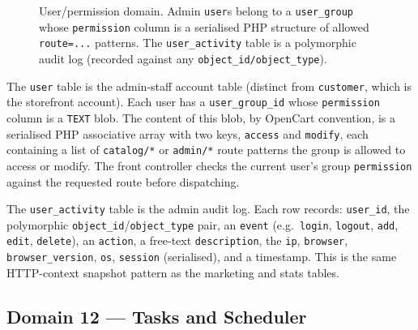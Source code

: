 \documentclass[11pt,a4paper]{article}
\begin{document}
\begin{figure}[htbp]
\centering
{}
\caption{User/permission domain. Admin \texttt{user}s belong to
a \texttt{user\_group} whose \texttt{permission} column is a
serialised PHP structure of allowed \texttt{route=...} patterns.
The \texttt{user\_activity} table is a polymorphic audit log
(recorded against any \texttt{object\_id/object\_type}).}
\label{fig:users}
\end{figure}

The \texttt{user} table is the admin-staff account table
(distinct from \texttt{customer}, which is the storefront
account). Each user has a \texttt{user\_group\_id} whose
\texttt{permission} column is a \texttt{TEXT} blob. The
content of this blob, by OpenCart convention, is a
serialised PHP associative array with two keys,
\texttt{access} and \texttt{modify}, each containing a list
of \texttt{catalog/*} or \texttt{admin/*} route patterns the
group is allowed to access or modify. The front controller
checks the current user's group \texttt{permission} against
the requested route before dispatching.

The \texttt{user\_activity} table is the admin audit log.
Each row records: \texttt{user\_id}, the polymorphic
\texttt{object\_id}/\texttt{object\_type} pair, an
\texttt{event} (e.g.\ \texttt{login}, \texttt{logout},
\texttt{add}, \texttt{edit}, \texttt{delete}), an
\texttt{action}, a free-text \texttt{description}, the
\texttt{ip}, \texttt{browser}, \texttt{browser\_version},
\texttt{os}, \texttt{session} (serialised), and a timestamp.
This is the same HTTP-context snapshot pattern as the
marketing and stats tables.

\subsection{Domain 12 --- Tasks and Scheduler}\label{sec:tasks}
\end{document}
